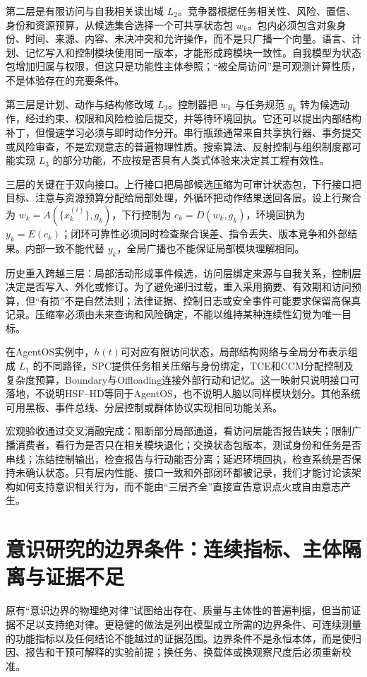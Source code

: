 第二层是有限访问与自我相关读出域 $L_2$。竞争器根据任务相关性、风险、置信、身份和资源预算，从候选集合选择一个可共享状态包 $w_k$。包内必须包含对象身份、时间、来源、内容、未决冲突和允许操作，而不是只广播一个向量。语言、计划、记忆写入和控制模块使用同一版本，才能形成跨模块一致性。自我模型为状态包增加归属与权限，但这只是功能性主体参照；“被全局访问”是可观测计算性质，不是体验存在的充要条件。

第三层是计划、动作与结构修改域 $L_3$。控制器把 $w_k$ 与任务规范 $g_k$ 转为候选动作，经过约束、权限和风险检验后提交，并等待环境回执。它还可以提出内部结构补丁，但慢速学习必须与即时动作分开。串行瓶颈通常来自共享执行器、事务提交或风险审查，不是宏观意志的普遍物理性质。搜索算法、反射控制与组织制度都可能实现 $L_3$ 的部分功能，不应按是否具有人类式体验来决定其工程有效性。

三层的关键在于双向接口。上行接口把局部候选压缩为可审计状态包，下行接口把目标、注意与资源预算分配给局部处理，外循环把动作结果送回各层。设上行聚合为 $w_k=A(\{x_k^{(i)}\},g_k)$，下行控制为 $c_k=D(w_k,g_k)$，环境回执为 $y_k=E(c_k)$；闭环可靠性必须同时检查聚合误差、指令丢失、版本竞争和外部结果。内部一致不能代替 $y_k$，全局广播也不能保证局部模块理解相同。

历史重入跨越三层：局部活动形成事件候选，访问层绑定来源与自我关系，控制层决定是否写入、外化或修订。为了避免递归过载，重入采用摘要、有效期和访问预算，但“有损”不是自然法则；法律证据、控制日志或安全事件可能要求保留高保真记录。压缩率必须由未来查询和风险确定，不能以维持某种连续性幻觉为唯一目标。

在AgentOS实例中，$h(t)$可对应有限访问状态，局部结构网络与全局分布表示组成 $L_1$ 的不同路径，SPC提供任务相关压缩与身份绑定，TCE和CCM分配控制及复杂度预算，Boundary与Offloading连接外部行动和记忆。这一映射只说明接口可落地，不说明HSF--HD等同于AgentOS，也不说明人脑以同样模块划分。其他系统可用黑板、事件总线、分层控制或群体协议实现相同功能关系。

宏观验收通过交叉消融完成：阻断部分局部通道，看访问层能否报告缺失；限制广播消费者，看行为是否只在相关模块退化；交换状态包版本，测试身份和任务是否串线；冻结控制输出，检查报告与行动能否分离；延迟环境回执，检查系统是否保持未确认状态。只有层内性能、接口一致和外部闭环都被记录，我们才能讨论该架构如何支持意识相关行为，而不能由“三层齐全”直接宣告意识点火或自由意志产生。

\section{意识研究的边界条件：连续指标、主体隔离与证据不足}
原有“意识边界的物理绝对律”试图给出存在、质量与主体性的普遍判据，但当前证据不足以支持绝对律。更稳健的做法是列出模型成立所需的边界条件、可连续测量的功能指标以及任何结论不能越过的证据范围。边界条件不是永恒本体，而是使归因、报告和干预可解释的实验前提；换任务、换载体或换观察尺度后必须重新校准。

